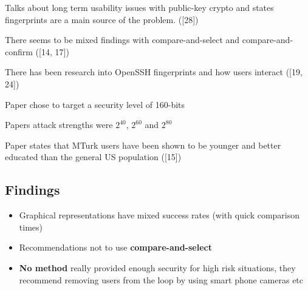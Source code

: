 Talks about long term usability issues with public-key crypto and states fingerprints are a main source of the problem. ([28])

There seems to be mixed findings with compare-and-select and compare-and-confirm ([14, 17])

There has been research into OpenSSH fingerprints and how users interact ([19, 24])

Paper chose to target a security level of 160-bits

Papers attack strengths were $2^{40}$, $2^{60}$ and $2^{80}$

Paper states that MTurk users have been shown to be younger and better educated than the general US population ([15])

\subsection{Findings}

\begin{itemize}
    \item Graphical representations have mixed success rates (with quick comparison times)
    \item Recommendations not to use \textbf{compare-and-select}
    \item \textbf{No method} really provided enough security for high risk situations, they recommend removing users from the loop by using smart phone cameras etc
\end{itemize}

\newpage





